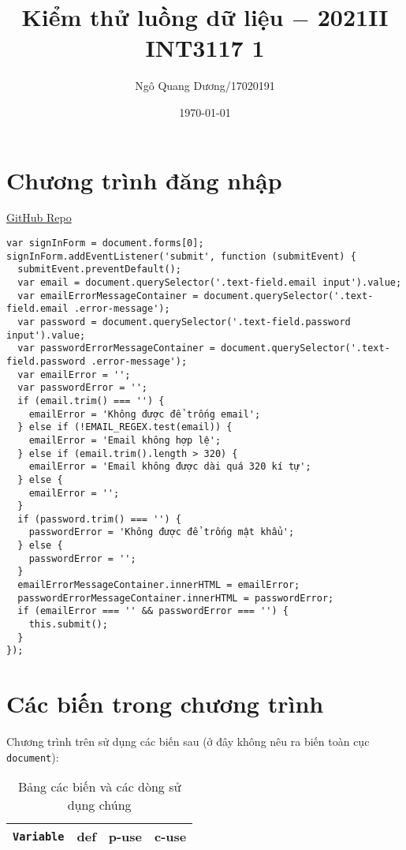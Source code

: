 \documentclass{article}
\title{\bf Kiểm thử luồng dữ liệu $-$ 2021II INT3117 1}
\author{Ngô Quang Dương/17020191}
\date{\today}
\begin{document}
\maketitle

\section{Chương trình đăng nhập}

\href{https://github.com/duong755/INT3117_1_2021II}{GitHub Repo}

\begin{verbatim}
var signInForm = document.forms[0];
signInForm.addEventListener('submit', function (submitEvent) {
  submitEvent.preventDefault();
  var email = document.querySelector('.text-field.email input').value;
  var emailErrorMessageContainer = document.querySelector('.text-field.email .error-message');
  var password = document.querySelector('.text-field.password input').value;
  var passwordErrorMessageContainer = document.querySelector('.text-field.password .error-message');
  var emailError = '';
  var passwordError = '';
  if (email.trim() === '') {
    emailError = 'Không được để trống email';
  } else if (!EMAIL_REGEX.test(email)) {
    emailError = 'Email không hợp lệ';
  } else if (email.trim().length > 320) {
    emailError = 'Email không được dài quá 320 kí tự';
  } else {
    emailError = '';
  }
  if (password.trim() === '') {
    passwordError = 'Không được để trống mật khẩu';
  } else {
    passwordError = '';
  }
  emailErrorMessageContainer.innerHTML = emailError;
  passwordErrorMessageContainer.innerHTML = passwordError;
  if (emailError === '' && passwordError === '') {
    this.submit();
  }
});
\end{verbatim}

\section{Các biến trong chương trình}

\par Chương trình trên sử dụng các biến sau (ở đây không nêu ra biến toàn cục \texttt{document}):

\begin{table}[htp]
    \centering
    \begin{tabular}{l|c|c|c}
        \texttt{Variable}                      & def                      & p-use            & c-use         \\
        \toprule
        \bottomrule
    \end{tabular}
    \caption{Bảng các biến và các dòng sử dụng chúng}
\end{table}
\end{document}
